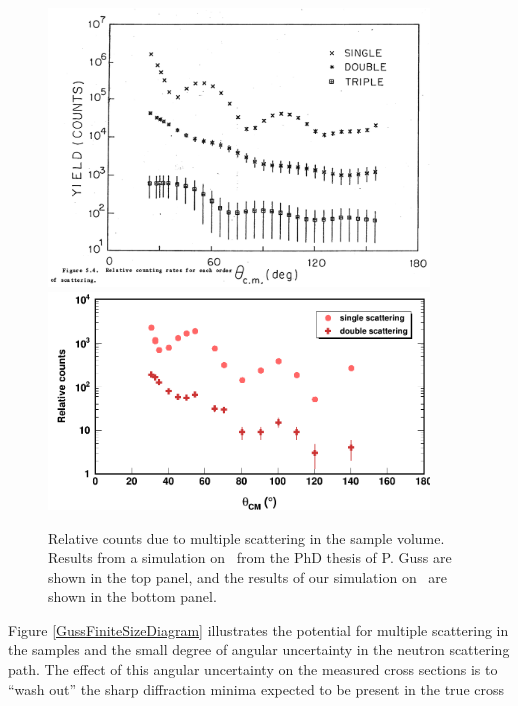 \begin{figure}[tb]
    \centering
    \includegraphics[width=0.9\textwidth]{figures/GussMultipleScattering.png}
    \label{GussMultipleScattering}
    \vspace*{\floatsep}
    \includegraphics[width=0.9\textwidth]{figures/multipleScattering.png}
    \caption[Relative counts due to multiple scattering in the sample volume]
    {
        Relative counts due to multiple scattering in the sample volume. Results from a simulation
        on \niEight\ from the PhD thesis of P. Guss \cite{GussPhDThesis} are shown in the top panel,
        and the results of our simulation on \snFour\ are shown in the bottom panel.
    }
    \label{multipleScattering}
\end{figure}
Figure \ref{GussFiniteSizeDiagram} illustrates the potential for multiple scattering in the samples
and the small degree of angular uncertainty in the neutron scattering path.
The effect of this angular uncertainty on the measured cross
sections is to ``wash out'' the sharp diffraction minima expected to be present in the true cross
